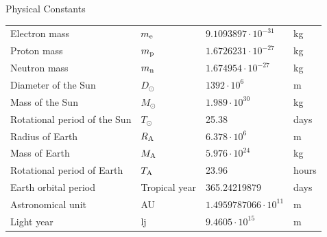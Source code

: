 \documentclass[10pt]{beamer}
\begin{document}
\begin{frame}[shrink=40]{Physical Constants}
\begin{center}
\begin{tabular}{||l|lll||}
\hline
Electron mass                &$m_{\rm e}$&$9.1093897\cdot10^{-31}$&kg\rule{0pt}{13pt}\\
Proton mass                  &$m_{\rm p}$&$1.6726231\cdot10^{-27}$&kg\\
Neutron mass                 &$m_{\rm n}$&$1.674954\cdot10^{-27}$&kg\\
\hline
Diameter of the Sun          &$D_\odot$&$1392\cdot10^6$&m\rule{0pt}{13pt}\\
Mass of the Sun              &$M_\odot$&$1.989\cdot10^{30}$&kg\\
Rotational period of the Sun &$T_\odot$&25.38&days\\
Radius of Earth              &$R_{\rm A}$&$6.378\cdot10^6$&m\\
Mass of Earth                &$M_{\rm A}$&$5.976\cdot10^{24}$&kg\\
Rotational period of Earth   &$T_{\rm A}$&23.96&hours\\
Earth orbital period         &Tropical year&365.24219879&days\\
Astronomical unit            &AU&$1.4959787066\cdot10^{11}$&m\\
Light year                   &lj&$9.4605\cdot10^{15}$&m\\
\hline
\end{tabular}
\label{PhysicalConstants}
\end{center}



\end{frame}
\end{document}
